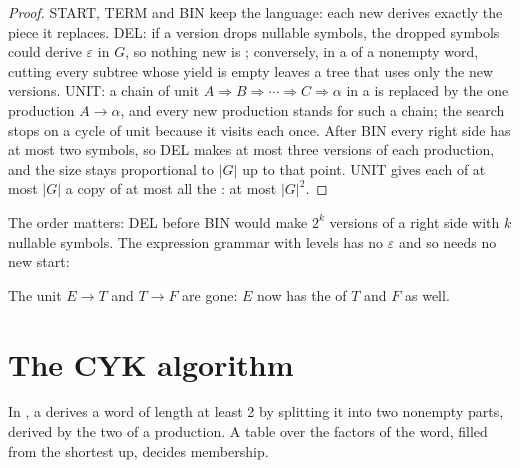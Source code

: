 \begin{proof}
START, TERM and BIN keep the language: each new  derives exactly the piece it replaces. DEL: if a version
drops nullable symbols, the dropped symbols could derive $\varepsilon$ in $G$, so nothing new is ; conversely,
in a  of a nonempty word, cutting every subtree whose yield is empty leaves a tree that uses only the new
versions. UNIT: a chain of unit  $A \Rightarrow B \Rightarrow \cdots \Rightarrow C \Rightarrow \alpha$ in a
 is replaced by the one production $A \to \alpha$, and every new production stands for such a chain; the
search stops on a cycle of unit  because it visits each  once. After BIN every right side has
at most two symbols, so DEL makes at most three versions of each production, and the size stays proportional to $|G|$
up to that point. UNIT gives each of at most $|G|$  a copy of at most all the : at most
$|G|^2$.
\end{proof}

The order matters: DEL before BIN would make $2^k$ versions of a right side with $k$ nullable symbols. The expression
grammar with levels has no $\varepsilon$ and so needs no new start:

\label{out:b2:context-free-languages:cnf}

The unit  $E \to T$ and $T \to F$ are gone: $E$ now has the  of $T$ and $F$ as well.

\section{The CYK algorithm}\label{sec:b2:context-free-languages:cyk}

In , a  derives a word of length at least 2 by splitting it into two nonempty parts,
derived by the two  of a production. A table over the factors of the word, filled from the shortest up,
decides membership.

